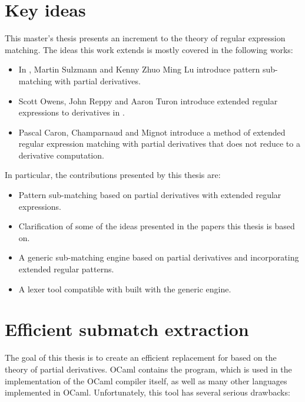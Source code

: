 \section{Key ideas}

This master's thesis presents an increment to the theory of regular expression
matching. The ideas this work extends is mostly covered in the following works:

\begin{itemize}
      
   \item In \cite{pdpat}, Martin Sulzmann and Kenny Zhuo Ming Lu introduce
      pattern sub-matching with partial derivatives.

   \item Scott Owens, John Reppy and Aaron Turon introduce extended regular
      expressions to derivatives in \cite{re-deriv}.

   \item Pascal Caron, Champarnaud and Mignot introduce a method of extended
      regular expression matching with partial derivatives that does not reduce
      to a derivative computation\cite{pdere}.

\end{itemize}

In particular, the contributions presented by this thesis are:

\begin{itemize}

   \item Pattern sub-matching based on partial derivatives with extended regular
      expressions.

   \item Clarification of some of the ideas presented in the papers this thesis
      is based on.

   \item A generic sub-matching engine based on partial derivatives and
      incorporating extended regular patterns.

   \item A lexer tool compatible with \ocamllex{} built with the generic engine.

\end{itemize}


\section{Efficient submatch extraction}

The goal of this thesis is to create an efficient replacement for \ocamllex{}
based on the theory of partial derivatives. OCaml contains the \ocamllex{}
program, which is used in the implementation of the OCaml compiler itself, as
well as many other languages implemented in OCaml.  Unfortunately, this tool has
several serious drawbacks:

